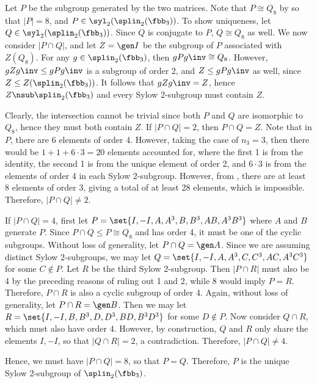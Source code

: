 \begin{sol}
	Let $P$ be the subgroup generated by the two matrices.
	Note that $P \cong Q_8$ by  so that $|P| = 8$, and $P \in \syl_2(\splin_2(\fbb_3))$.
	To show uniqueness, let $Q \in \syl_2(\splin_2(\fbb_3))$.
	Since $Q$ is conjugate to $P$, $Q \cong Q_8$ as well.
	We now consider $|P \cap Q|$, and let $Z = \gen I$ be the subgroup of $P$ associated with $Z(Q_8)$.
	For any $g \in \splin_2(\fbb_3)$, then $gPg\inv \cong Q_8$.
	However, $gZg\inv \leq gPg\inv$ is a subgroup of order 2, and $Z \leq gPg\inv$ as well, since $Z \leq Z(\splin_2(\fbb_3))$.
	It follows that $gZg\inv = Z$, hence $Z \nsub \splin_2(\fbb_3)$ and every Sylow 2-subgroup must contain $Z$.

	Clearly, the intersection cannot be trivial since both $P$ and $Q$ are isomorphic to $Q_8$, hence they must both contain $Z$.
	If $|P \cap Q| = 2$, then $P \cap Q = Z$.
	Note that in $P$, there are 6 elements of order 4.
	However, taking the case of $n_3 = 3$, then there would be $1 + 1 + 6 \cdot 3 = 20$ elements accounted for, where the first 1 is from the identity, the second 1 is from the unique element of order 2, and $6 \cdot 3$ is from the elements of order 4 in each Sylow 2-subgroup.
	However, from , there are at least 8 elements of order 3, giving a total of at least 28 elements, which is impossible.
	Therefore, $|P \cap Q| \neq 2$.

	If $|P \cap Q| = 4$, first let $P = \set{I, -I, A, A^3, B, B^3, AB, A^3B^3}$ where $A$ and $B$ generate $P$.
	Since $P \cap Q \leq P \cong Q_8$ and has order 4, it must be one of the cyclic subgroups.
	Without loss of generality, let $P \cap Q = \gen A$.
	Since we are assuming distinct Sylow 2-subgroups, we may let $Q = \set{I, -I, A, A^3, C, C^3, AC, A^3C^3}$ for some $C \notin P$.
	Let $R$ be the third Sylow 2-subgroup.
	Then $|P \cap R|$ must also be 4 by the preceding reasons of ruling out 1 and 2, while 8 would imply $P = R$.
	Therefore, $P \cap R$ is also a cyclic subgroup of order 4.
	Again, without loss of generality, let $P \cap R = \gen B$.
	Then we may let $R = \set{I, -I, B, B^3, D, D^3, BD, B^3D^3}$ for some $D \notin P$.
	Now consider $Q \cap R$, which must also have order 4.
	However, by construction, $Q$ and $R$ only share the elements $I, -I$, so that $|Q \cap R| = 2$, a contradiction.
	Therefore, $|P \cap Q| \neq 4$.

	Hence, we must have $|P \cap Q| = 8$, so that $P = Q$.
	Therefore, $P$ is the unique Sylow 2-subgroup of $\splin_2(\fbb_3)$.
\end{sol}

